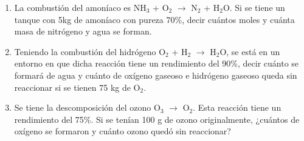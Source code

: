 \begin{enumerate}
\item La combustión del amoníaco es NH$_3$ + O$_2$ $\longrightarrow$ N$_2$ + H$_2$O. Si se tiene un tanque con 5kg de amoníaco con pureza 70\%, decir cuántos moles y cuánta masa de nitrógeno y agua se forman.

\item Teniendo la combustión del hidrógeno O$_2$ + H$_2$ $\longrightarrow$ H$_2$O, se está en un entorno en que dicha reacción tiene un rendimiento del 90\%, decir cuánto se formará de agua y cuánto de oxígeno gaseoso e hidrógeno gaseoso queda sin reaccionar si se tienen 75 kg de O$_2$.

\item Se tiene la descomposición del ozono O$_3$ $\longrightarrow$ O$_2$. Esta reacción tiene un rendimiento del 75\%. Si se tenían 100 g de ozono originalmente, ¿cuántos de oxígeno se formaron y cuánto ozono quedó sin reaccionar?
    
\end{enumerate}
